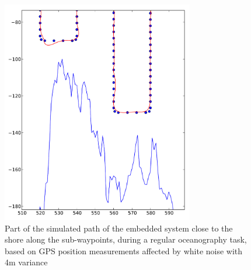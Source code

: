 \documentclass{ifacconf}
\begin{document}
\begin{figure}
	\begin{center}
		\includegraphics[width=8.4cm]{img/Navi}    %
		\caption{Part of the simulated path of the embedded system close to the shore along the sub-waypoints, during a regular oceanography task, based on GPS position measurements affected by white noise with 4m variance}  %
		\label{fig:navi}               
	\end{center}                                 %
\end{figure}
\end{document}
